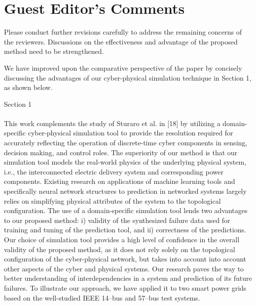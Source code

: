 \documentclass{article}
\newenvironment{response}{
  \doublespacing
  \setlength\parindent{0.05\linewidth}
  \ttfamily
}{}
\newenvironment{textblock}[1]
{\begin{tcolorbox}[breakable,enhanced]{#1 \\ \\}}
{\end{tcolorbox}}
\begin{document}
\section{Guest Editor's Comments}
\label{sec:editor}
Please conduct further revisions carefully to address the remaining concerns of the reviewers. Discussions on the effectiveness and advantage of the proposed method need to be strengthened.

\begin{response}
We have improved upon the comparative perspective of the paper by concisely discussing the advantages of our cyber-physical simulation technique in Section 1, as shown below.

\begin{textblock}{Section 1}
This work complements the study of Sturaro et al. in [18] by utilizing a domain-specific cyber-physical simulation tool to provide the resolution required for accurately reflecting the operation of discrete-time cyber components in sensing, decision making, and control roles. The superiority of our method is that our simulation tool models the real-world physics of the underlying physical system, i.e., the interconnected electric delivery system and corresponding power components.  Existing research on applications of machine learning tools and specifically neural network structures to prediction in networked systems largely relies on simplifying physical attributes of the system to the topological configuration. The use of a domain-specific simulation tool lends two advantages to our proposed method: i) validity of the synthesized failure data used for training and tuning of the prediction tool, and ii) correctness of the predictions. Our choice of simulation tool provides a high level of confidence in the overall validity of the proposed method, as it does not rely solely on the topological configuration of the cyber-physical network, but takes into account into account other aspects of the cyber and physical systems. Our research paves the way to better understanding of interdependencies in a system and prediction of its future failures. To illustrate our approach, we have applied it to two smart power grids based on the well-studied IEEE 14--bus and 57--bus test systems.
\end{textblock}

\end{response}
\end{document}
